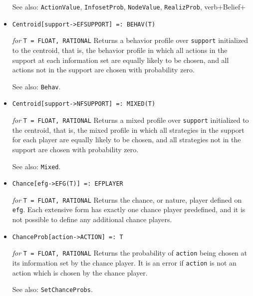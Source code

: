 \begin{itemize}
\item [See also:] \verb+ActionValue+, \verb+InfosetProb+, \verb+NodeValue+,
\verb+RealizProb+, verb+Belief+
\ed




\item{}
\protect \large \begin{verbatim} 
Centroid[support->EFSUPPORT] =: BEHAV(T)
\end{verbatim}\normalsize

{\it for} {\tt T = FLOAT, RATIONAL}
\bd
Returns a behavior profile over \verb+support+ initialized to the
centroid, that is, the behavior profile in which all actions in the
support at each information set are equally likely to be chosen, and
all actions not in the support are chosen with probability zero.
\item [See also:] \verb+Behav+.
\ed

\item{}
\protect \large \begin{verbatim}
Centroid[support->NFSUPPORT] =: MIXED(T)
\end{verbatim}\normalsize

{\it for} {\tt T = FLOAT, RATIONAL}
\bd
Returns a mixed profile over \verb+support+
initialized to the centroid, that is, the mixed profile in which 
all strategies in the support for each player are equally likely to be
chosen, and all strategies not in the support are chosen with probability
zero.
\item [See also:] \verb+Mixed+.
\ed

\item{}
\protect \large \begin{verbatim}
Chance[efg->EFG(T)] =: EFPLAYER
\end{verbatim}\normalsize

{\it for} {\tt T = FLOAT, RATIONAL}
\bd
Returns the chance, or nature, player defined on \verb+efg+.
Each extensive form has exactly one
chance player predefined, and it is not possible to define any additional
chance players.
\ed

\item{}
\protect \large \begin{verbatim}
ChanceProb[action->ACTION] =: T
\end{verbatim}\normalsize

{\it for} {\tt T = FLOAT, RATIONAL}
\bd
Returns the probability of \verb+action+ being chosen at its information
set by the chance player.  It is an error if \verb+action+ is not an action
which is chosen by the chance player.
\item [See also:] \verb+SetChanceProbs+.
\ed


\end{itemize}
